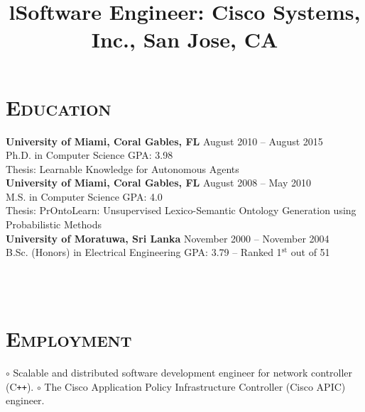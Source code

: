 \begin{resume}



\vspace{-5mm}
\section{\textsc{Education}}

\textbf{University of Miami, Coral Gables, FL} \hfill August 2010 -- August  2015 \\
Ph.D. in Computer Science \hfill GPA: 3.98 \\
Thesis: Learnable Knowledge for Autonomous Agents \\
\newline
\textbf{University of Miami, Coral Gables, FL} \hfill August 2008 -- May 2010 \\
M.S. in Computer Science \hfill GPA: 4.0 \\
Thesis: PrOntoLearn: Unsupervised Lexico-Semantic Ontology Generation using Probabilistic Methods \\
\newline
\textbf{University of Moratuwa, Sri Lanka} \hfill November 2000 -- November 2004 \\ 
B.Sc. (Honors) in Electrical Engineering \hfill GPA: 3.79 -- Ranked 1$^{\mbox{st}}$ out of 51




\begin{formatb}
  \title{l}\\
  \body\\
\end{formatb}

\vspace{-2mm}
\section{\textsc{Employment}}

\title{\textbf{Software Engineer: Cisco Systems, Inc., San Jose, CA}}
\begin{position}
$\circ$ Scalable and distributed software development engineer for network controller (C\texttt{++}).   \newline $\circ$  The Cisco Application Policy Infrastructure Controller (Cisco APIC) engineer. 
\end{position}




\end{resume}

